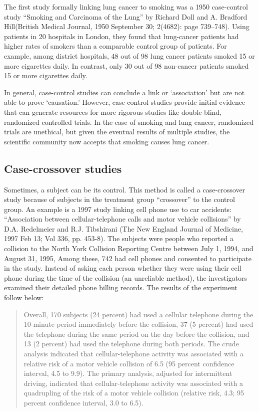 \documentclass[11pt]{book}\usepackage[]{graphicx}\usepackage[]{color}
\begin{document}
The first study formally linking lung cancer to smoking was a 1950 case-control study ``Smoking and Carcinoma of the Lung'' by Richard Doll and A. Bradford Hill(British Medical Journal, 1950 September 30; 2(4682): page 739--748).  Using patients in 20 hospitals in London, they found that lung-cancer patients had higher rates of smokers than a comparable control group of patients.   For example, among district hospitals, 48 out of 98 lung cancer patients smoked 15 or more cigarettes daily.  In contrast, only 30 out of 98 non-cancer patients smoked 15 or more cigarettes daily.  

In general, case-control studies can conclude a link or `association' but are not able to prove `causation.'   However, case-control studies provide initial evidence that can generate resources for more rigorous studies like double-blind, randomized controlled trials.  In the case of smoking and lung cancer, randomized trials are unethical, but given the eventual results of multiple studies, the scientific community now accepts that smoking causes lung cancer.  
\citep{doll1950}

\subsection{Case-crossover studies}

Sometimes, a subject can be its control.  This method is called a case-crossover study because of subjects in the treatment group ``crossover'' to the control group.  An example is a 1997 study linking cell phone use to car accidents: ``Association between cellular-telephone calls and motor vehicle collisions'' by D.A. Redelmeier and R.J. Tibshirani (The New England Journal of Medicine, 1997 Feb 13; Vol 336, pp. 453-8).  The subjects were people who reported a collision to the North York Collision Reporting Centre between July 1, 1994, and August 31, 1995, Among these, 742 had cell phones and consented to participate in the study.  Instead of asking each person whether they were using their cell phone during the time of the collision (an unreliable method), the investigators examined their detailed phone billing records.  The results of the experiment follow below:

\begin{quotation}
Overall, 170 subjects (24 percent) had used a cellular telephone during the 10-minute period immediately before the collision, 37 (5 percent) had used the telephone during the same period on the day before the collision, and 13 (2 percent) had used the telephone during both periods. The crude analysis indicated that cellular-telephone activity was associated with a relative risk of a motor vehicle collision of 6.5 (95 percent confidence interval, 4.5 to 9.9).  The primary analysis, adjusted for intermittent driving, indicated that cellular-telephone activity was associated with a quadrupling of the risk of a motor vehicle collision (relative risk, 4.3; 95 percent confidence interval, 3.0 to 6.5).
\end{quotation}  \citep{redelmeier1997}
\end{document}

